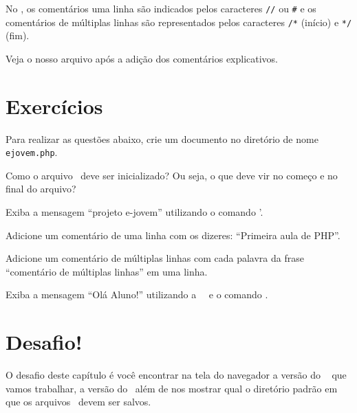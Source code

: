 No \php, os comentários uma linha são indicados pelos caracteres \verb$//$ ou \verb$#$
e os comentários de múltiplas linhas são representados pelos caracteres 
\verb$/*$ (início) e \verb$*/$ (fim).

Veja o nosso arquivo  após a adição dos comentários explicativos.



\section{Exercícios}
\label{cap1-exercicios}

Para realizar as questões abaixo, crie um documento no diretório  
de nome \texttt{ejovem.php}.

\begin{description}[labelindent=19pt]
  \item [Q. 1] Como o arquivo \phpextensao~deve ser inicializado? Ou seja, o que deve vir no
  começo e no final do arquivo?
  \item [Q. 2] Exiba a mensagem ``projeto e-jovem'' utilizando o comando \funcaoecho'.
  \item [Q. 3] Adicione um comentário de uma linha com os dizeres: ``Primeira aula de PHP''.
  \item [Q. 4] Adicione um comentário de múltiplas linhas com cada palavra da frase 
  ``comentário de múltiplas linhas'' em uma linha.
  \item [Q. 5] Exiba a mensagem ``Olá Aluno!'' utilizando a \tag~\taghum~e o comando \funcaoecho.
\end{description}

\section{Desafio!}
\label{desafio}
O desafio deste capítulo é você encontrar na tela do navegador a versão do \php~
que vamos trabalhar, a versão do \apache~além de nos mostrar qual o diretório
padrão em que os arquivos \phpextensao~devem ser salvos.